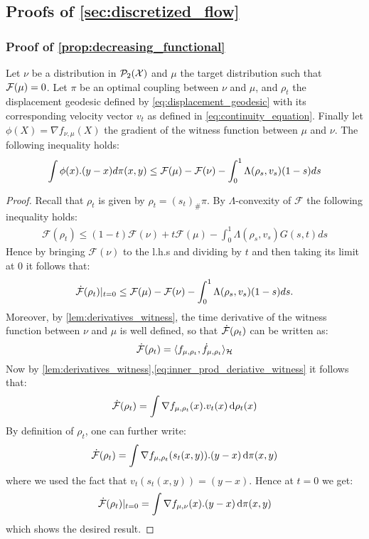 
\subsection{Proofs of \cref{sec:discretized_flow}}

\subsubsection{Proof of \cref{prop:decreasing_functional}}

\begin{lemma}	\label{lem:grad_flow_lambda_version}
Let $\nu$ be a distribution in $\mathcal{P}_2({{\mathcal X}})$ and $\mu$ the target distribution such that ${{\mathcal F}}(\mu)=0$.  Let $\pi$ be an optimal coupling between $\nu$ and $\mu$, and $\rho_t$ the displacement geodesic defined by \cref{eq:displacement_geodesic} with its corresponding velocity vector  $v_t$ as defined in \cref{eq:continuity_equation}. Finally let $\phi(X)=\nabla f_{\nu,\mu}(X)$ the gradient of the witness function between $\mu$ and $\nu$. The following inequality holds: 
\begin{align*}
	\int \phi(x).(y-x) d\pi(x,y)
	\leq
	{{\mathcal F}}(\mu)- {{\mathcal F}}(\nu) -\int_0^1 \Lambda(\rho_s,v_s)(1-s)ds
\end{align*}

\end{lemma}
\begin{proof}
Recall that $\rho_t$ is given by $\rho_t = (s_t)_{\#}\pi$. By $\Lambda$-convexity of $\mathcal{F}$ the following inequality holds:
	\begin{align*}
		\mathcal{F}(\rho_{t})\leq (1-t)\mathcal{F}(\nu)+t \mathcal{F}(\mu) - \int_0^1 \Lambda(\rho_s,v_s)G(s,t)ds
	\end{align*}
	Hence by bringing $\mathcal{F}(\nu)$ to the l.h.s and dividing by $t$ and then taking its limit at $0$ it follows that:
	\begin{align*}
	\dot{{{\mathcal F}}}(\rho_t)\vert_{t=0}\leq \mathcal	{F}(\mu)-\mathcal{F}(\nu)-\int_0^1 \Lambda(\rho_s,v_s)(1-s)ds.	
	\end{align*}
	Moreover, by \cref{lem:derivatives_witness}, the time derivative of the witness function between $\nu$ and $\mu$ is well defined, so that $\dot{{{\mathcal F}}}(\rho_t)$ can be written as:
	\[
	\dot{{{\mathcal F}}}(\rho_t) = \langle f_{\mu,\rho_t},\dot{f}_{\mu,\rho_t} \rangle_{{{\mathcal H}}}
	\]
	Now by \cref{lem:derivatives_witness},\cref{eq:inner_prod_deriative_witness} it follows that:
\[
\dot{{{\mathcal F}}}(\rho_t) = \int \nabla f_{\mu,\rho_t}(x).v_t(x)\mathop{}\!\mathrm{d} \rho_t(x)
\]
By definition of $\rho_t$,  one can further write:
\[
\dot{{{\mathcal F}}}(\rho_t) = \int \nabla f_{\mu,\rho_t}(s_t(x,y)).(y-x)\mathop{}\!\mathrm{d} \pi(x,y)
\]
where we used the fact that $v_t(s_t(x,y))=(y-x)$. Hence at $t=0$ we get:
\[
\dot{{{\mathcal F}}}(\rho_t)\vert_{t=0} = \int \nabla f_{\mu,\nu}(x).(y-x)\mathop{}\!\mathrm{d} \pi(x,y)
\]
which shows the desired result.
\end{proof}





